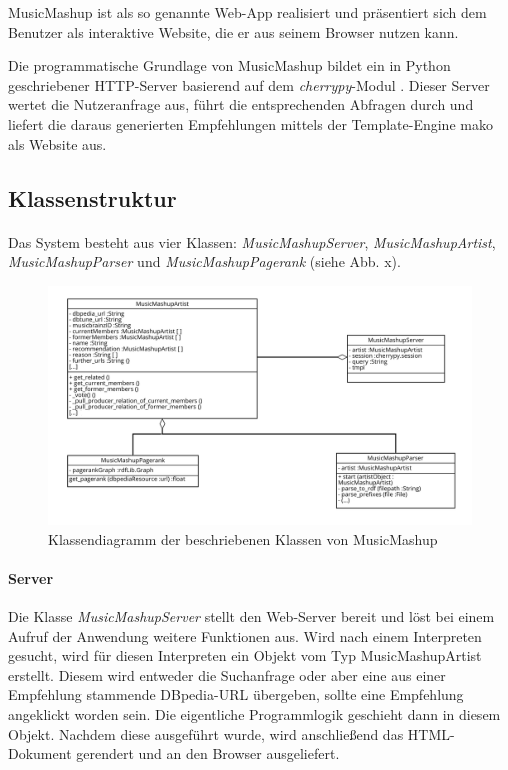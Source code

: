 MusicMashup ist als so genannte Web-App realisiert und präsentiert sich dem Benutzer als interaktive Website, die er aus seinem Browser nutzen kann.

Die programmatische Grundlage von MusicMashup bildet ein in Python geschriebener 
HTTP-Server basierend auf dem \textit{cherrypy}-Modul \cite{cherrypy}. Dieser Server wertet die Nutzeranfrage aus, führt die entsprechenden Abfragen durch und liefert die daraus generierten Empfehlungen mittels der Template-Engine mako \cite{mako} als Website aus. 

\subsection{Klassenstruktur}


\paragraph{}Das System besteht aus vier Klassen: \textit{MusicMashupServer}, \textit{MusicMashupArtist}, \textit{MusicMashupParser} und \textit{MusicMashupPagerank} (siehe Abb. x).


\begin{figure}[ht!]
\centering
\includegraphics[width=137mm]{bilder/klassendiagramm.png}
\caption{Klassendiagramm der beschriebenen Klassen von MusicMashup \label{overflow}}
\end{figure}

\paragraph{Server} Die Klasse \textit{MusicMashupServer} stellt den Web-Server bereit und löst bei einem Aufruf der Anwendung weitere Funktionen aus. Wird nach einem Interpreten gesucht, wird für diesen Interpreten ein Objekt vom Typ MusicMashupArtist erstellt. Diesem wird entweder die Suchanfrage oder aber eine aus einer Empfehlung stammende DBpedia-URL übergeben, sollte eine Empfehlung angeklickt worden sein. Die eigentliche Programmlogik geschieht dann in diesem Objekt. Nachdem diese ausgeführt wurde, wird anschließend das HTML-Dokument gerendert und an den Browser ausgeliefert.


